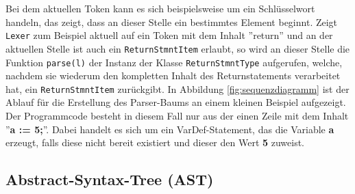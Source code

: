 Bei dem aktuellen Token kann es sich beispielsweise um ein Schlüsselwort handeln, das zeigt, dass an dieser Stelle ein bestimmtes Element beginnt.
Zeigt \texttt{Lexer} zum Beispiel aktuell auf ein Token mit dem Inhalt ''return'' und an der aktuellen Stelle ist auch ein \texttt{ReturnStmntItem} erlaubt, so wird an dieser Stelle die Funktion \texttt{parse(l)} der Instanz der Klasse \texttt{ReturnStmntType} aufgerufen, welche, nachdem sie wiederum den kompletten Inhalt des Returnstatements verarbeitet hat, ein \texttt{ReturnStmntItem} zurückgibt.
\newline
\newline
In Abbildung \ref{fig:sequenzdiagramm} ist der Ablauf für die Erstellung des Parser-Baums an einem kleinen Beispiel aufgezeigt. Der Programmcode besteht in diesem Fall nur aus der einen Zeile mit dem Inhalt ''\textbf{a := 5;}''. Dabei handelt es sich um ein VarDef-Statement, das die Variable \textbf{a} erzeugt, falls diese nicht bereit existiert und dieser den Wert \textbf{5} zuweist.





\subsection{Abstract-Syntax-Tree (AST)}\label{subsection:ast}

